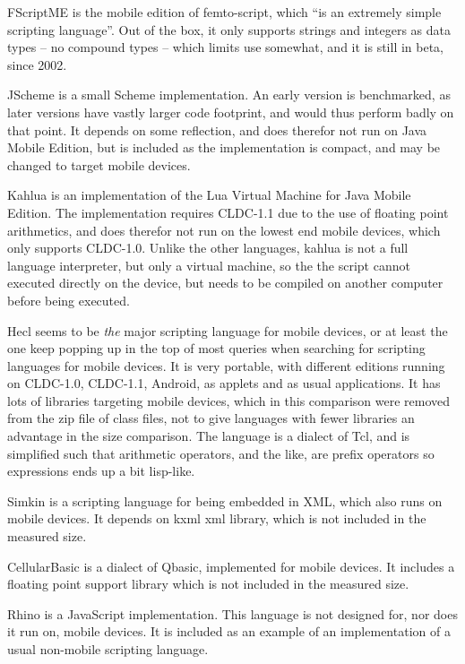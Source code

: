 \documentclass[11pt]{report}
\begin{document}
FScriptME\cite{fscriptme} is the mobile edition of femto-script, which ``is an extremely simple scripting language''\cite{fscript}. 
Out of the box, it only supports strings and integers as data types -- no compound types -- which limits use somewhat, and it is still in beta, since 2002. 

JScheme\cite{jscheme} is a small Scheme implementation. An early version is benchmarked, as later versions have vastly larger code footprint, and would thus perform badly on that point. It depends on some reflection, and does therefor not run on Java Mobile Edition, but is included as the implementation is compact, and may be changed to target mobile devices.

Kahlua\cite{kahlua} is an implementation of the Lua Virtual Machine for Java Mobile Edition. 
The implementation requires CLDC-1.1 due to the use of floating point arithmetics, and does therefor not run on the lowest end mobile devices, which only supports CLDC-1.0.
Unlike the other languages, kahlua is not a full language interpreter, but only a virtual machine, so the the script cannot executed directly on the device, but needs to be compiled on another computer before being executed.

Hecl\cite{hecl} seems to be \emph{the} major scripting language for mobile devices, or at least the one keep popping up in the top of most queries when searching for scripting languages for mobile devices.
It is very portable, with different editions running on CLDC-1.0, CLDC-1.1, Android, as applets and as usual applications.
It has lots of libraries targeting mobile devices, which in this comparison were removed from the zip file of class files, not to give languages with fewer libraries an advantage in the size comparison.
The language is a dialect of Tcl, and is simplified such that arithmetic operators, and the like, are prefix operators so expressions ends up a bit lisp-like.

Simkin\cite{simkin} is a scripting language for being embedded in XML, which also runs on mobile devices. It depends on kxml xml library, which is not included in the measured size. 

CellularBasic\cite{cellularbasic} is a dialect of Qbasic, implemented for mobile devices. 
It includes a floating point support library which is not included in the measured size. 

Rhino\cite{rhino} is a JavaScript implementation. This language is not designed for, nor does it run on, mobile devices. It is included as an example of an implementation of a usual non-mobile scripting language.
\end{document}
